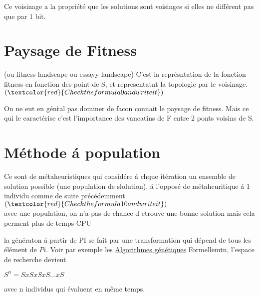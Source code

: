 \begin{itemize}
Ce voisinage a la propri\'et\'e que les solutions sont voisinges si elles ne diff\'erent pas que par 1 bit.

\section{Paysage de Fitness}
(ou fitness landscape ou essayy landscape)
C'est la repr\'esntation de la fonction fitness en fonction des point de S, et representatnt la topologie par le voisinage.\\
$(\textcolor{red}{Check the formula 9 and write it})$

On ne eut en g\'en\`ral pas dominer de facon {connait} le paysage de fitness.
Mais ce qui le caract\'erise c'est l'importance des  {vancatins} de F entre 2 ponts voisins de S.

\section{M\'ethode \'a population}
Ce sont de m\'etaheuristiques qui consid\'ere \'a chque it\'eration un ensemble de solution possible (une population de slolution), \'a l'oppos\'e de m\'etaheuritique \'a 1 individu comme de suite pr\'ec\'edemment\\
$(\textcolor{red}{Check the formula 10 and write it})$\\
avec une population, on n'a pas de chance d etrouve une bonne solution mais cela perment plus de temps CPU

la g\'en\'eraton \'a partir de PI se fait par une transformation qui d\'epend de tous les \'el\'ement de $Pi$. Voir par exemple les \underline{Algorithmes g\'en\'etiques}
Formellemtn, l'espace de recherche devient \\ 
\begin{center}
$S^n=SxSxSxS...xS$
\end{center}
avec n individus qui \'evaluent en m\^eme temps.
\end{itemize}
